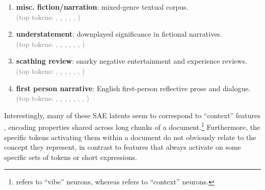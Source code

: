 \begin{minipage}{\textwidth}
\begin{enumerate}
    \item[\#401] \textbf{misc. fiction/narration}: mixed-genre textual corpus. \\
    \textcolor{gray}{(top tokens: , , , , , )}
    
    \item[\#249] \textbf{understatement}: downplayed significance in fictional narratives. \\
    \textcolor{gray}{(top tokens: , , , , , , )}
    
    \item[\#269] \textbf{scathing review}: snarky negative entertainment and experience reviews. \\
    \textcolor{gray}{(top tokens: , , , , , , )}
    
    \item[\#573] \textbf{first person narrative}: English first-person reflective prose and dialogue. \\
    \textcolor{gray}{(top tokens: , , , , , , , )}
\end{enumerate}
\end{minipage}

Interestingly, many of these SAE latents seem to correspond to ``context'' features \citep{gurnee2023finding,bills2023languagemodelscanexplainneurons}, encoding properties shared across long chunks of a document.\footnote{\citet{bills2023languagemodelscanexplainneurons} refers to ``vibe'' neurons, whereas \citet{gurnee2023finding} refers to ``context'' neurons.} Furthermore, the specific tokens activating them within a document do not obviously relate to the concept they represent, in contrast to features that always activate on some specific sets of tokens or short expressions. 

